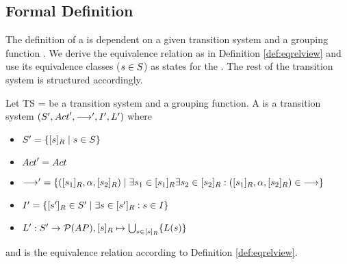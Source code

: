 \documentclass[preview]{standalone}
\begin{document}
\subsection{Formal Definition}

The definition of a \viewN is dependent on a given transition system and a grouping function \grpfct. We derive the equivalence relation \eqrelview as in Definition \ref{def:eqrelview} and use its equivalence classes  (${s} \in {S}$) as states for the \viewN. The rest of the transition system is structured accordingly.


\begin{definition}
	
	Let TS = \transitionsystem be a transition system and \grpfct a grouping function. A \emph{\viewN} \view{\viewppty} is a transition system $({S}', {Act}',{\longrightarrow}', {I}', {L}')$  where
	
	\begin{itemize}
		\item ${S}' = \{ {[{s}]_{{R}}} \mid {s} \in {S} \}$
		
		\item ${Act}' = {Act}$
		
		\item ${\longrightarrow}' = \{ ({{[{s}_1]_{{R}}}}, {\alpha}, {{[{s}_2]_{{R}}}}) \mid \exists {s}_1 \in {\ensuremath{{[{s}_1]_{{R}}}}} \exists {s}_2 \in {\ensuremath{{[{s}_2]_{{R}}}}} : ({{[{s}_1]_{{R}}}}, {\alpha}, {{[{s}_2]_{{R}}}}) \in {\longrightarrow}\}$%
		
		\item ${I}' = \{{{[{s}']_{{R}}}} \in {S}' \mid \exists {s} \in {\ensuremath{{[{s}']_{{R}}}}} : {s} \in {I} \}$
		
		\item ${L}': {S}' \to {\mathcal{P}(\ensuremath{{AP}})}, {{[{s}]_{{R}}}}\mapsto \bigcup_{{s} \in {\ensuremath{{[{s}]_{{R}}}}}} \{{L}({s})\}$
		
	\end{itemize}
	
	and \eqrelview is the equivalence relation according to Definition \ref{def:eqrelview}.
	

	\label{def:view}	
\end{definition}
\end{document}
